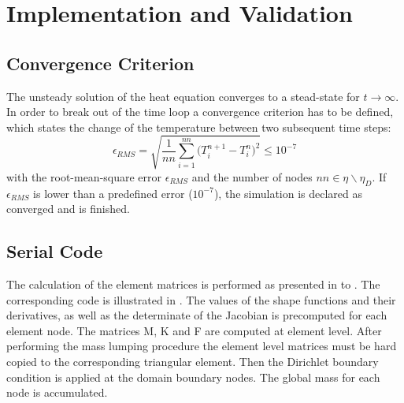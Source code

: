 \section{Implementation and Validation}

\subsection{Convergence Criterion}
The unsteady solution of the heat equation converges to a stead-state for $t\rightarrow \infty$. In order to break out of the time loop a convergence criterion has to be defined, which states the change of the temperature between two subsequent time steps:
\begin{equation}
	\epsilon_{RMS} = \sqrt{\frac{1}{nn} \sum_{i=1}^{nn} \Big( T_i^{n+1} - T_i^n \Big)^2} \leq 10^{-7}
\end{equation}
with the root-mean-square error $\epsilon_{RMS}$ and the number of nodes $nn \in \eta \backslash \eta_D$. If $\epsilon_{RMS}$ is lower than a predefined error ($10^{-7}$), the simulation is declared as converged and is finished.

\subsection{Serial Code}

The calculation of the element matrices is performed as presented in  to . The corresponding code is illustrated in . The values of the shape functions and their derivatives, as well as the determinate of the Jacobian is precomputed for each element node. The matrices M, K and F are computed at element level. After performing the mass lumping procedure the element level matrices must be hard copied to the corresponding triangular element.
Then the Dirichlet boundary condition  is applied at the domain boundary nodes. The global mass for each node is accumulated. 

